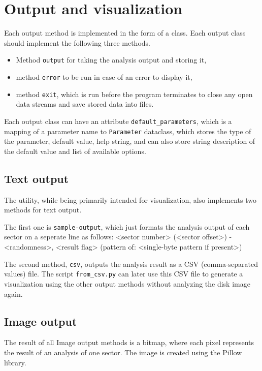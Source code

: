 \documentclass[
  digital, %
  color,   %
  oneside, %
  lof,     %
  nolot,     %
]{fithesis4}
\begin{document}
\section{Output and visualization}
\label{sec:output-and-visualization}

Each output method is implemented in the form of a class.
Each output class should implement the following three methods.
\begin{itemize}
    \item Method \texttt{output} for taking the analysis output and storing it,
    \item method \texttt{error} to be run in case of an error to display it,
    \item method \texttt{exit}, which is run before the program terminates to close any open data streams and save stored data into files.
\end{itemize}
Each output class can have an attribute \texttt{default\_parameters}, which is a mapping of a parameter name to \texttt{Parameter} dataclass, which stores the type of the parameter, default value, help string, and can also store string description of the default value and list of available options.

\subsection{Text output}
\label{ssec:text-output}

The utility, while being primarily intended for visualization, also implements two methods for text output.

The first one is \texttt{sample-output}, which just formats the analysis output of each sector on a seperate line as follows: <sector number> (<sector offset>) - <randomness>, <result flag> (pattern of: <single-byte pattern if present>)

The second method, \texttt{csv}, outputs the analysis result as a CSV (comma-separated values) file.
The script \texttt{from\_csv.py} can later use this CSV file to generate a visualization using the other output methods without analyzing the disk image again.

\subsection{Image output}
\label{ssec:image-output}

The result of all Image output methods is a bitmap, where each pixel represents the result of an analysis of one sector.
The image is created using the Pillow library.\cite{pillow}
\end{document}
